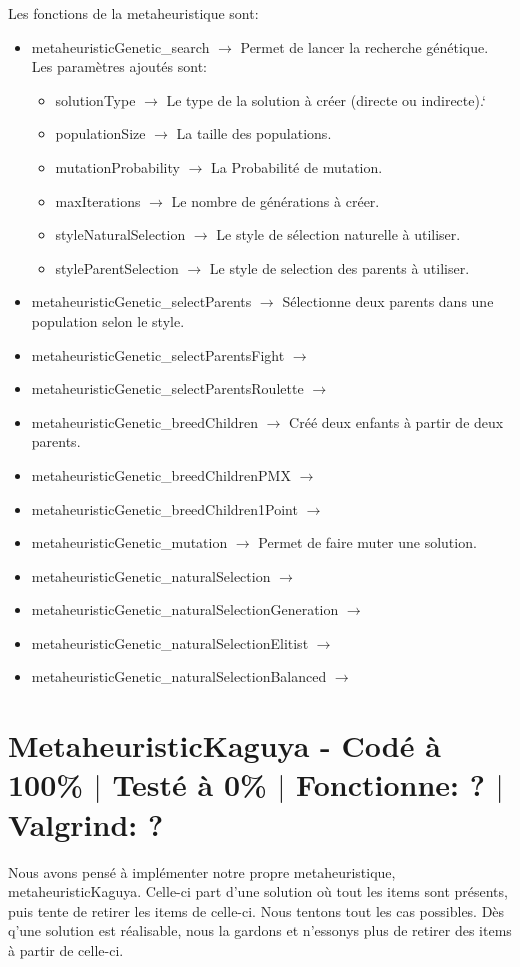 \documentclass{EPUProjetPeiP}
\newcommand{\comp}[5]{
	\section[#1]{#1 {\small - Codé à #2\% $\vert$ Testé à #3\% $\vert$ Fonctionne: #4 $\vert$ Valgrind: #5}}
}
\begin{document}
Les fonctions de la metaheuristique sont:
\begin{itemize}
	\item metaheuristicGenetic\_search $\longrightarrow$ Permet de lancer la recherche génétique. Les paramètres ajoutés sont:
	\begin{itemize}
		\item solutionType $\longrightarrow$ Le type de la solution à créer (directe ou indirecte).`
		\item populationSize $\longrightarrow$ La taille des populations.
		\item mutationProbability $\longrightarrow$ La Probabilité de mutation.
		\item maxIterations $\longrightarrow$ Le nombre de générations à créer.
		\item styleNaturalSelection $\longrightarrow$ Le style de sélection naturelle à utiliser.
		\item styleParentSelection $\longrightarrow$ Le style de selection des parents à utiliser.
	\end{itemize}
	\item metaheuristicGenetic\_selectParents $\longrightarrow$ Sélectionne deux parents dans une population selon le style.
	\item metaheuristicGenetic\_selectParentsFight $\longrightarrow$ %
	\item metaheuristicGenetic\_selectParentsRoulette $\longrightarrow$ %
	\item metaheuristicGenetic\_breedChildren $\longrightarrow$ Créé deux enfants à partir de deux parents.
	\item metaheuristicGenetic\_breedChildrenPMX $\longrightarrow$ %
	\item metaheuristicGenetic\_breedChildren1Point $\longrightarrow$ %
	\item metaheuristicGenetic\_mutation $\longrightarrow$ Permet de faire muter une solution.
	\item metaheuristicGenetic\_naturalSelection $\longrightarrow$ %
	\item metaheuristicGenetic\_naturalSelectionGeneration $\longrightarrow$ %
	\item metaheuristicGenetic\_naturalSelectionElitist $\longrightarrow$ %
	\item metaheuristicGenetic\_naturalSelectionBalanced $\longrightarrow$ %
\end{itemize}

\comp{MetaheuristicKaguya}{100}{0}{?}{?}
Nous avons pensé à implémenter notre propre metaheuristique, metaheuristicKaguya. Celle-ci part d'une solution où tout les items sont présents, puis tente de retirer les items de celle-ci. Nous tentons tout les cas possibles. Dès q'une solution est réalisable, nous la gardons et n'essonys plus de retirer des items à partir de celle-ci.
\end{document}
